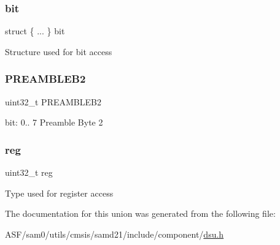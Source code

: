 \subsubsection{\texorpdfstring{bit}{bit}}
{\footnotesize\ttfamily struct \{ ... \}   bit}

Structure used for bit access \mbox{\label{union_d_s_u___c_i_d2___type_a8a84d2ae965a94dc3afde1bbce29324b}} 
\subsubsection{\texorpdfstring{PREAMBLEB2}{PREAMBLEB2}}
{\footnotesize\ttfamily uint32\+\_\+t P\+R\+E\+A\+M\+B\+L\+E\+B2}

bit\+: 0.. 7 Preamble Byte 2 \mbox{\label{union_d_s_u___c_i_d2___type_a6b91636401516a477989a336376d7b40}} 
\subsubsection{\texorpdfstring{reg}{reg}}
{\footnotesize\ttfamily uint32\+\_\+t reg}

Type used for register access 

The documentation for this union was generated from the following file\+:\begin{DoxyCompactItemize}
\item 
A\+S\+F/sam0/utils/cmsis/samd21/include/component/\mbox{\hyperlink{component_2dsu_8h}{dsu.\+h}}\end{DoxyCompactItemize}
